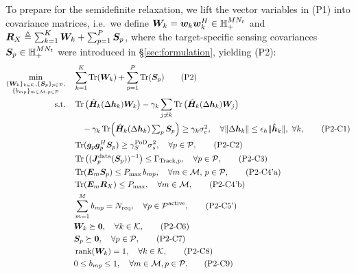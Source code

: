 To prepare for the semidefinite relaxation, we lift the vector variables in (P1) into covariance matrices, i.e.\ we define $\bm{W}_k = \bm{w}_k \bm{w}_k^H \in \mathbb{H}_+^{MN_t}$ and $\bm{R}_X \triangleq \sum_{k=1}^K \bm{W}_k + \sum_{p=1}^P \bm{S}_p$, where the target-specific sensing covariances $\bm{S}_p \in \mathbb{H}_+^{MN_t}$ were introduced in \S\ref{sec:formulation}, yielding (P2):
\begin{align}
\min_{\substack{\{\bm{W}_k\}_{k\in\mathcal{K}}, \{\bm{S}_p\}_{p\in\mathcal{P}}, \\ \{b_{mp}\}_{m\in\mathcal{M},p\in\mathcal{P}}}} \quad
& \sum_{k=1}^K \operatorname{Tr}(\bm{W}_k) + \sum_{p=1}^P \operatorname{Tr}(\bm{S}_p) \tag{P2} \\
\text{s.t.} \quad
& \operatorname{Tr}\big(\hat{\bm{H}}_k(\Delta\bm{h}_k) \bm{W}_k\big)
  - \gamma_k \sum_{j \neq k}
    \operatorname{Tr}\big(\hat{\bm{H}}_k(\Delta\bm{h}_k) \bm{W}_j\big) \notag\\
&\quad - \gamma_k \operatorname{Tr}\!\Big(\hat{\bm{H}}_k(\Delta\bm{h}_k)
    \textstyle\sum_p \bm{S}_p\Big)
  \geq \gamma_k \sigma_c^2,
  \quad \forall \|\Delta\bm{h}_k\| \leq \epsilon_h \|\hat{\bm{h}}_k\|,
  \ \forall k, \tag{P2-C1} \\
& \operatorname{Tr}(\bm{g}_p \bm{g}_p^H \bm{S}_p) \geq \gamma_S^{\text{PoD}} \sigma_s^2, \quad \forall p \in \mathcal{P}, \tag{P2-C2} \\
& \operatorname{Tr}\big((\bm{J}_p^{\text{data}}(\bm{S}_p))^{-1}\big) \leq \Gamma_{\text{Track},p}, \quad \forall p \in \mathcal{P}, \tag{P2-C3} \label{eq:p2c3} \\
& \operatorname{Tr}(\bm{E}_m \bm{S}_p) \leq P_{\max} \, b_{mp}, \quad \forall m \in \mathcal{M}, \, p \in \mathcal{P}, \tag{P2-C4'a} \\
& \operatorname{Tr}(\bm{E}_m \bm{R}_X) \leq P_{\max}, \quad \forall m \in \mathcal{M}, \tag{P2-C4'b} \\
& \sum_{m=1}^{M} b_{mp} = N_{\text{req}}, \quad \forall p \in \mathcal{P}^{\text{active}}, \tag{P2-C5'} \\
& \bm{W}_k \succeq \bm{0}, \quad \forall k \in \mathcal{K}, \tag{P2-C6} \\
& \bm{S}_p \succeq \bm{0}, \quad \forall p \in \mathcal{P}, \tag{P2-C7} \\
& \operatorname{rank}(\bm{W}_k) = 1, \quad \forall k \in \mathcal{K}, \tag{P2-C8} \\
& 0 \leq b_{mp} \leq 1, \quad \forall m \in \mathcal{M}, p \in \mathcal{P}. \tag{P2-C9}
\end{align}
